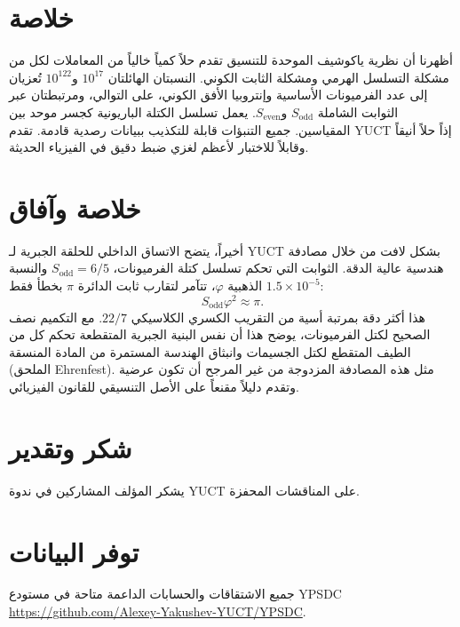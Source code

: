 \documentclass[12pt,a4paper]{article}
\begin{document}
	\section{خلاصة}
	
	أظهرنا أن نظرية ياكوشيف الموحدة للتنسيق تقدم حلاً كمياً خالياً من المعاملات لكل من مشكلة التسلسل الهرمي ومشكلة الثابت الكوني. النسبتان الهائلتان \(10^{17}\) و\(10^{122}\) تُعزيان إلى عدد الفرميونات الأساسية وإنتروبيا الأفق الكوني، على التوالي، ومرتبطتان عبر الثوابت الشاملة \(S_{\mathrm{odd}}\) و\(S_{\mathrm{even}}\). يعمل تسلسل الكتلة الباريونية كجسر موحد بين المقياسين. جميع التنبؤات قابلة للتكذيب ببيانات رصدية قادمة. تقدم YUCT إذاً حلاً أنيقاً وقابلاً للاختبار لأعظم لغزي ضبط دقيق في الفيزياء الحديثة.
	
	\section*{خلاصة وآفاق}
	
	أخيراً، يتضح الاتساق الداخلي للحلقة الجبرية لـ YUCT بشكل لافت من خلال مصادفة هندسية عالية الدقة. الثوابت التي تحكم تسلسل كتلة الفرميونات، \(S_{\mathrm{odd}}=6/5\) والنسبة الذهبية \(\varphi\)، تتآمر لتقارب ثابت الدائرة \(\pi\) بخطأ فقط \(1.5\times10^{-5}\):
	\[
	S_{\mathrm{odd}}\varphi^2 \approx \pi .
	\]
	هذا أكثر دقة بمرتبة أسية من التقريب الكسري الكلاسيكي \(22/7\). مع التكميم نصف الصحيح لكتل الفرميونات، يوضح هذا أن نفس البنية الجبرية المتقطعة تحكم كل من الطيف المتقطع لكتل الجسيمات وانبثاق الهندسة المستمرة من المادة المنسقة (الملحق Ehrenfest). مثل هذه المصادفة المزدوجة من غير المرجح أن تكون عرضية وتقدم دليلاً مقنعاً على الأصل التنسيقي للقانون الفيزيائي.
	
	\section*{شكر وتقدير}
	
	يشكر المؤلف المشاركين في ندوة YUCT على المناقشات المحفزة.
	
	\section*{توفر البيانات}
	
	جميع الاشتقاقات والحسابات الداعمة متاحة في مستودع YPSDC \url{https://github.com/Alexey-Yakushev-YUCT/YPSDC}.
	
\end{document}
